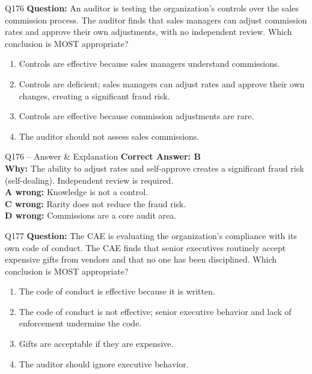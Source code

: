 \documentclass[aspectratio=169,10pt]{beamer}
\begin{document}
	\begin{frame}[t]{Q176}
		\small
		\textbf{Question:} An auditor is testing the organization's controls over the sales commission process. The auditor finds that sales managers can adjust commission rates and approve their own adjustments, with no independent review. Which conclusion is MOST appropriate?
		\begin{enumerate}[label=\Alph*.,itemsep=1pt,topsep=2pt]
			\item Controls are effective because sales managers understand commissions.
			\item Controls are deficient; sales managers can adjust rates and approve their own changes, creating a significant fraud risk.
			\item Controls are effective because commission adjustments are rare.
			\item The auditor should not assess sales commissions.
		\end{enumerate}
	\end{frame}
	
	\begin{frame}[t]{Q176 -- Answer \& Explanation}
		\small
		\textbf{Correct Answer: B} \\[4pt]
		\textbf{Why:} The ability to adjust rates and self-approve creates a significant fraud risk (self-dealing). Independent review is required. \\[4pt]
		\textbf{A wrong:} Knowledge is not a control. \\[2pt]
		\textbf{C wrong:} Rarity does not reduce the fraud risk. \\[2pt]
		\textbf{D wrong:} Commissions are a core audit area.
	\end{frame}
	
	\begin{frame}[t]{Q177}
		\small
		\textbf{Question:} The CAE is evaluating the organization's compliance with its own code of conduct. The CAE finds that senior executives routinely accept expensive gifts from vendors and that no one has been disciplined. Which conclusion is MOST appropriate?
		\begin{enumerate}[label=\Alph*.,itemsep=1pt,topsep=2pt]
			\item The code of conduct is effective because it is written.
			\item The code of conduct is not effective; senior executive behavior and lack of enforcement undermine the code.
			\item Gifts are acceptable if they are expensive.
			\item The auditor should ignore executive behavior.
		\end{enumerate}
	\end{frame}
	
\end{document}
